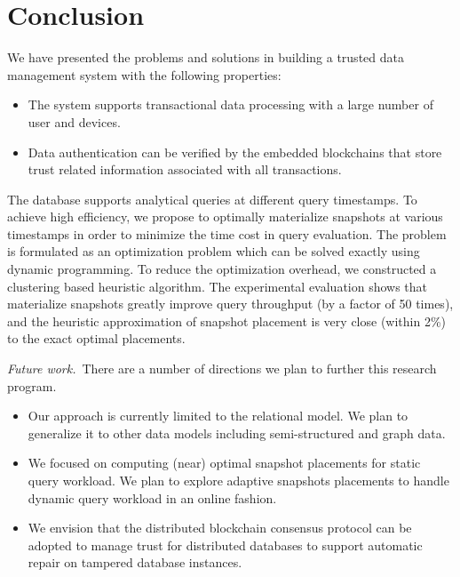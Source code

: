 \section{Conclusion}

We have presented the problems and solutions in building a trusted data
management system with the following properties:

\begin{itemize}
\item The system supports transactional data processing with a large number of user and devices.
\item Data authentication can be verified by the embedded blockchains that store
    trust related information associated with all transactions.
\end{itemize}

The database supports analytical
queries at different query timestamps.  To achieve high efficiency, we propose
to optimally materialize snapshots at various timestamps in order to
minimize the time cost in query evaluation.  The problem is formulated as
an optimization problem which can be solved exactly using dynamic
programming.  To reduce the optimization overhead, we constructed a clustering
based heuristic algorithm.  The experimental evaluation shows that materialize
snapshots greatly improve query throughput (by a factor of 50 times), and the
heuristic approximation of snapshot placement is very close (within 2\%) to the
exact optimal placements.

\medskip

{\em Future work.}\ There are a number of directions we plan to further this
research program.

\begin{itemize}
\item Our approach is currently limited to the relational model.  We plan to
generalize it to other data models including semi-structured and graph data.
\item We focused on computing (near) optimal snapshot placements for static
query workload.  We plan to explore adaptive snapshots placements to handle
dynamic query workload in an online fashion.
\item We envision that the
distributed blockchain consensus protocol can be adopted to manage trust for distributed
databases to support automatic repair on tampered database instances.
\end{itemize}

